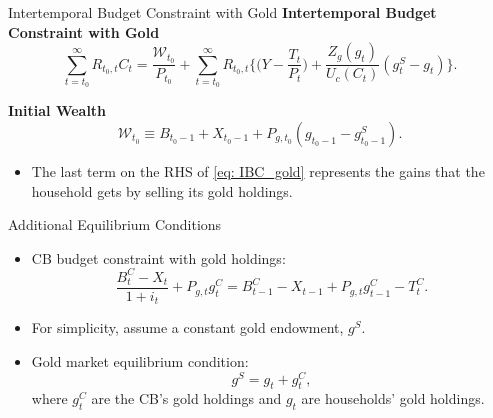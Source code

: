 \documentclass[11pt,aspectratio=169]{beamer}
\begin{document}
\begin{frame}{Intertemporal Budget Constraint with Gold}
\textbf{Intertemporal Budget Constraint with Gold}
\begin{equation} \label{eq: IBC_gold}
\sum_{t=t_0}^{\infty} R_{t_0,t} C_t = \frac{\mathcal{W}_{t_0}}{P_{t_0}} + 
\sum_{t=t_0}^{\infty} R_{t_0,t} \Bigg\{ \Big(Y - \frac{T_t}{P_t}\Big) + \frac{Z_g(g_t)}{U_c(C_t)} (g_t^S - g_t) \Bigg\}.
\end{equation}
\vspace{0.15cm}

\textbf{Initial Wealth}
\begin{equation}
\mathcal{W}_{t_0} \equiv B_{t_0-1} + X_{t_0-1} + P_{g,t_0} (g_{t_0-1} - g_{t_0-1}^S).
\end{equation}
\vspace{0.3cm}
\begin{itemize}
    \item The last term on the RHS of \eqref{eq: IBC_gold} represents the gains that the household gets by selling its gold holdings.
\end{itemize}
\end{frame}

\begin{frame}{Additional Equilibrium Conditions}
\begin{itemize}
    \item CB budget constraint with gold holdings:
    \begin{equation}
    \frac{B_{t}^{C}-X_{t}}{1+i_{t}} + P_{g,t} g_{t}^{C} =
    B_{t-1}^{C}-X_{t-1} + P_{g,t} g_{t-1}^{C} - T_{t}^{C}.
    \label{BC_gold}
    \end{equation}
    \vspace{0.2cm}
    \item For simplicity, assume a constant gold endowment, $g^S$.
     \vspace{0.2cm}
    \item Gold market equilibrium condition:
    \begin{equation}
        g^S = g_t + g_t^C,
    \end{equation}
    where $g_t^C$ are the CB’s gold holdings and $g_t$ are households’ gold holdings.
\end{itemize}
\end{frame}
\end{document}
